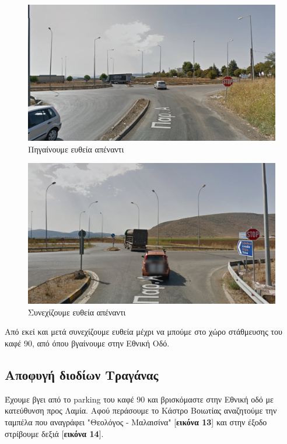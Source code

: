 \begin{figure}[hbp!]
	\centering
		\includegraphics[width=\textwidth]{images/athina-lamia/thiva/thiva3.PNG}
			\caption{Πηγαίνουμε ευθεία απέναντι}
\end{figure}
\begin{figure}[hbp!]
	\centering
		\includegraphics[width=\textwidth]{images/athina-lamia/thiva/thiva4.PNG}
			\caption{Συνεχίζουμε ευθεία απέναντι}
\end{figure}
Από εκεί και μετά συνεχίζουμε ευθεία μέχρι να μπούμε στο χώρο στάθμευσης του καφέ 90, από όπου βγαίνουμε στην Εθνική Οδό.
\newpage
\begin{center}
\section*{Αποφυγή διοδίων Τραγάνας}
\end{center}
Έχουμε βγει από το parking του καφέ 90 και βρισκόμαστε στην Εθνική οδό με κατεύθυνση προς Λαμία. Αφού περάσουμε το Κάστρο Βοιωτίας αναζητούμε την ταμπέλα που αναγράφει "Θεολόγος - Μαλαισίνα" [\textbf{εικόνα 13}] και στην έξοδο στρίβουμε δεξιά [\textbf{εικόνα 14}].

